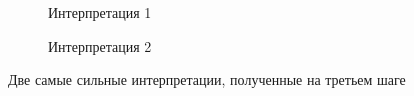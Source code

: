 \documentclass{article}
\begin{document}
\begin{articletext}
\bfullwidth
\begin{figure}
        \centering
        \begin{subfigure}[b]{0.42\textwidth}
                \caption{Интерпретация 1}
        \end{subfigure}%
        \quad%
        \begin{subfigure}[b]{0.42\textwidth}
                \caption{Интерпретация 2}
        \end{subfigure}
        \caption{Две самые сильные интерпретации, полученные на третьем шаге}\label{step6}
\end{figure}
\efullwidth


\end{articletext}
\end{document}
